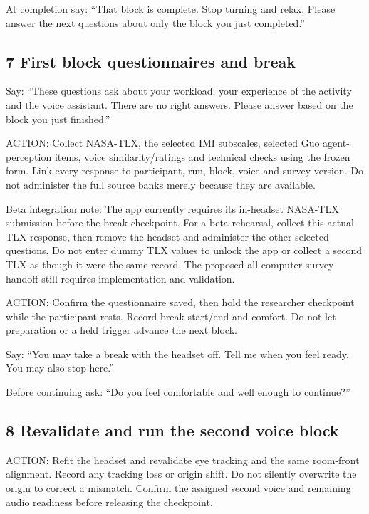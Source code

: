 At completion say: ``That block is complete. Stop turning and relax.
Please answer the next questions about only the block you just
completed.''

\subsection{7 First block questionnaires and
break}\label{first-block-questionnaires-and-break}

Say: ``These questions ask about your workload, your experience of the
activity and the voice assistant. There are no right answers. Please
answer based on the block you just finished.''

ACTION: Collect NASA-TLX, the selected IMI subscales, selected Guo
agent-perception items, voice similarity/ratings and technical checks
using the frozen form. Link every response to participant, run, block,
voice and survey version. Do not administer the full source banks merely
because they are available.

Beta integration note: The app currently requires its in-headset
NASA-TLX submission before the break checkpoint. For a beta rehearsal,
collect this actual TLX response, then remove the headset and administer
the other selected questions. Do not enter dummy TLX values to unlock
the app or collect a second TLX as though it were the same record. The
proposed all-computer survey handoff still requires implementation and
validation.

ACTION: Confirm the questionnaire saved, then hold the researcher
checkpoint while the participant rests. Record break start/end and
comfort. Do not let preparation or a held trigger advance the next
block.

Say: ``You may take a break with the headset off. Tell me when you feel
ready. You may also stop here.''

Before continuing ask: ``Do you feel comfortable and well enough to
continue?''

\subsection{8 Revalidate and run the second voice
block}\label{revalidate-and-run-the-second-voice-block}

ACTION: Refit the headset and revalidate eye tracking and the same
room-front alignment. Record any tracking loss or origin shift. Do not
silently overwrite the origin to correct a mismatch. Confirm the
assigned second voice and remaining audio readiness before releasing the
checkpoint.

